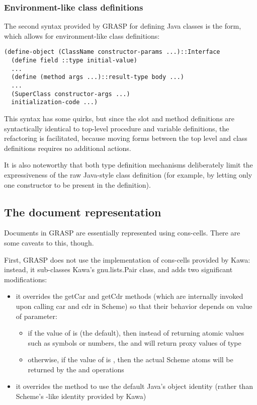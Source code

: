 \documentclass[11pt]{article}
\begin{document}
\subsubsection{Environment-like class definitions}
\label{sec:org9fabdb9}

The second syntax provided by GRASP for defining
Java classes is the form, which allows
for environment-like class definitions:

\begin{verbatim}
(define-object (ClassName constructor-params ...)::Interface
  (define field ::type initial-value)
  ...
  (define (method args ...)::result-type body ...)
  ...
  (SuperClass constructor-args ...)
  initialization-code ...)
\end{verbatim}

This syntax has some quirks, but since the slot and method
definitions are syntactically identical to top-level procedure
and variable definitions, the refactoring is facilitated,
because moving forms between the top level and class definitions
requires no additional actions.

It is also noteworthy that both type definition mechanisms
deliberately limit the expressiveness of the raw Java-style
class definition (for example, by letting only one constructor
to be present in the definition).

\subsection{The document representation}
\label{sec:org9f59646}

Documents in GRASP are essentially represented
using cons-cells. There are some caveats to this, though.

First, GRASP does not use the implementation of cons-cells
provided by Kawa: instead, it sub-classes Kawa's gnu.lists.Pair
class, and adds two significant modifications:
\begin{itemize}
\item it overrides the getCar and getCdr methods (which are
internally invoked upon calling car and cdr in Scheme)
so that their behavior depends on value of 
parameter:
\begin{itemize}
\item if the value of is 
(the default), then
instead of returning atomic values such as symbols or numbers, 
the and will return proxy 
values of type
\item otherwise, if the value of 
is , then the actual
Scheme atoms will be returned by the and 
operations
\end{itemize}
\item it overrides the method to use the default Java's
object identity (rather than Scheme's -like
identity provided by Kawa)
\end{itemize}
\end{document}
